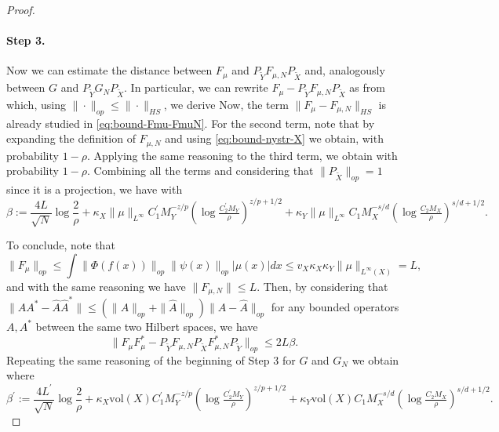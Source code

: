 \begin{proof}
\paragraph{Step 3.}
Now we can estimate the distance between $F_\mu$ and $P_{\tilde{Y}}F_{\mu,N} P_{\tilde{X}}$ and, analogously between $G$ and $P_{\tilde{Y}}G_N P_{\tilde{X}}$. In particular, we can rewrite $F_\mu - P_{\tilde{Y}}F_{\mu,N} P_{\tilde{X}}$ as
from which, using $\|\cdot\|_{op} \leq \|\cdot\|_{HS}$, we derive
Now, the term $\|F_\mu - F_{\mu,N}\|_{HS}$ is already studied in \cref{eq:bound-Fmu-FmuN}. For the second term, note that by expanding the definition of $F_{\mu,N}$ and using \cref{eq:bound-nystr-X} we obtain,
with probability $1-\rho$.
Applying the same reasoning to the third term, we obtain
with probability $1-\rho$.
Combining all the terms and considering that $\|P_{\tilde{X}}\|_{op} = 1$ since it is a projection, we have
with
$$ \beta := \frac{4 L}{\sqrt{N}} \log \frac{2}{\rho} + \kappa_X \|\mu\|_{L^\infty} C^\prime_1 M_Y^{-z/p} (\log \tfrac{C^\prime_2 M_Y}{\rho})^{z/p+1/2} + \kappa_Y \|\mu\|_{L^\infty} C_1 M_X^{-s/d} (\log \tfrac{C_2 M_X}{\rho})^{s/d+1/2}.$$

To conclude, note that
$$\|F_{\mu}\|_{op} \leq \int \|\Phi(f(x))\|_{op}\|\psi(x)\|_{op} |\mu(x)| dx \leq v_X \kappa_X \kappa_Y \|\mu\|_{L^\infty(X)} = L,$$
and with the same reasoning we have $\|F_{\mu,N}\| \leq L$. Then, by considering that $\|AA^* - \hat{A}\hat{A}^*\| \leq (\|A\|_{op} + \|\hat{A}\|_{op})\|A-\hat{A}\|_{op}$ for any bounded operators $A,A^*$ between the same two Hilbert spaces, we have
$$
\|F_\mu F_{\mu}^* - P_{\tilde{Y}}F_{\mu,N} P_{\tilde{X}} F_{\mu,N}^*P_{\tilde{Y}}\|_{op} \leq 2L \beta.
$$
Repeating the same reasoning of the beginning of Step 3 for $G$ and $G_N$ we obtain
where
$$
\beta^\prime := \frac{4 L^\prime}{\sqrt{N}} \log \frac{2}{\rho} + \kappa_X \textrm{vol}(X) C^\prime_1 M_Y^{-z/p} (\log \tfrac{C^\prime_2 M_Y}{\rho})^{z/p+1/2} + \kappa_Y \textrm{vol}(X) C_1 M_X^{-s/d} (\log \tfrac{C_2 M_X}{\rho})^{s/d+1/2}.
$$




\end{proof}
